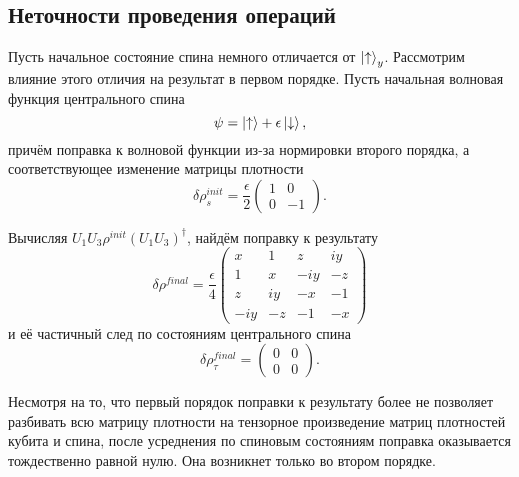 \documentclass[a4paper,12pt]{article}
\theoremstyle{plain} %
\theoremstyle{definition} %
\theoremstyle{remark} %
\begin{document}
\subsection{Неточности проведения операций}

Пусть начальное состояние спина немного отличается от $\ket{\uparrow}_y$. Рассмотрим влияние этого отличия на результат в первом порядке. 
Пусть начальная волновая функция центрального спина
\begin{equation}
    \psi = \ket{\uparrow} + \epsilon \ket{\downarrow},
\end{equation}
причём поправка к волновой функции из-за нормировки второго порядка, а соответствующее изменение матрицы плотности
\begin{equation}
    \delta\rho^{init}_s = \frac{\epsilon}{2}
    \begin{pmatrix}
        1 & 0 \\
        0 & -1 
    \end{pmatrix}.
\end{equation}

Вычисляя $U_1 U_3 \rho^{init} (U_1 U_3)^\dagger$, найдём поправку к результату
\begin{equation}
    \delta \rho^{final} = \frac{\epsilon}{4}
    \begin{pmatrix}
        x & 1 & z & i y \\
        1 & x & - i y & -z \\
        z & i y & -x & -1 \\
        - i y & - z & -1 & -x
    \end{pmatrix}
\end{equation}
и её частичный след по состояниям центрального спина
\begin{equation}
    \delta \rho^{final}_\tau = 
    \begin{pmatrix}
        0 & 0 \\
        0 & 0
    \end{pmatrix}.
\end{equation}

Несмотря на то, что первый порядок поправки к результату более не позволяет разбивать всю матрицу плотности на тензорное произведение матриц плотностей кубита и спина, после усреднения по спиновым состояниям поправка оказывается тождественно равной нулю. Она возникнет только во втором порядке.
\end{document}
